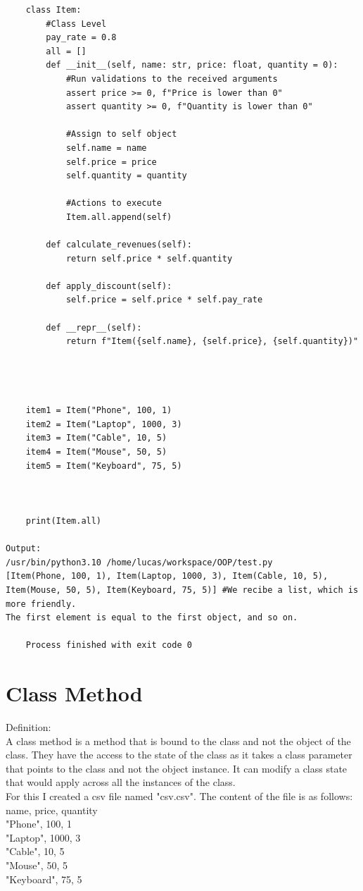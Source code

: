 \documentclass{article}
\begin{document}
\begin{lstlisting}
	class Item:
		#Class Level
		pay_rate = 0.8
		all = []
		def __init__(self, name: str, price: float, quantity = 0):
			#Run validations to the received arguments
			assert price >= 0, f"Price is lower than 0"
			assert quantity >= 0, f"Quantity is lower than 0"
			
			#Assign to self object
			self.name = name
			self.price = price
			self.quantity = quantity
			
			#Actions to execute
			Item.all.append(self)
			
		def calculate_revenues(self):
			return self.price * self.quantity
		
		def apply_discount(self):
			self.price = self.price * self.pay_rate
		
		def __repr__(self):
			return f"Item({self.name}, {self.price}, {self.quantity})"
		
		
		
	
	item1 = Item("Phone", 100, 1)
	item2 = Item("Laptop", 1000, 3)
	item3 = Item("Cable", 10, 5)
	item4 = Item("Mouse", 50, 5)
	item5 = Item("Keyboard", 75, 5)
	
	
	
	print(Item.all)
	
Output:
/usr/bin/python3.10 /home/lucas/workspace/OOP/test.py 
[Item(Phone, 100, 1), Item(Laptop, 1000, 3), Item(Cable, 10, 5), Item(Mouse, 50, 5), Item(Keyboard, 75, 5)] #We recibe a list, which is more friendly.
The first element is equal to the first object, and so on.
	
	Process finished with exit code 0
\end{lstlisting}

\section{Class Method}
Definition:\\
A class method is a method that is bound to the class and not the object of the class. They have the access to the state of the class as it takes a class parameter that points to the class and not the object instance. It can modify a class state that would apply across all the instances of the class.\\


For this I created a csv file named "csv.csv". The content of the file is as follows:\\

\centering
\noindent name, price, quantity\\
\noindent"Phone", 100, 1\\
\noindent"Laptop", 1000, 3\\
\noindent"Cable", 10, 5\\
\noindent"Mouse", 50, 5\\
\noindent"Keyboard", 75, 5\\
\end{document}
